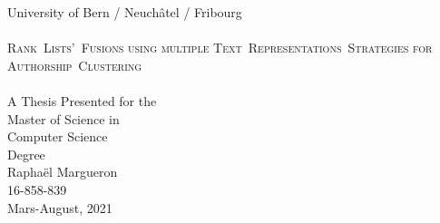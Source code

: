 \begin{titlepage}
  \vspace*{\fill}
  \begin{center}
    {\Large University of Bern / Neuchâtel / Fribourg}
    \\[3.0cm]
    \makebox[\linewidth]{\rule{0.8\paperwidth}{0.4pt}}
    \\[0.9cm]
    {\huge \scshape Rank~Lists'~Fusions using multiple Text~Representations~Strategies for Authorship~Clustering}
    \\[0.5cm]
    \makebox[\linewidth]{\rule{0.8\paperwidth}{0.4pt}}
    \\[2.0cm]
    {\large A Thesis Presented for the \\ Master of Science in \\ Computer Science \\ Degree}
    \\[3.5cm]
    {\Large Raphaël Margueron}
    \\
    {\large 16-858-839}
    \\[0.8cm]
    {\large Mars-August, 2021}
    \\[4.0cm]
  \end{center}
  \vspace*{\fill}
\end{titlepage}
